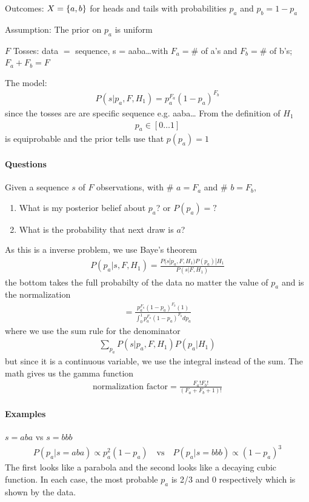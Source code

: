 \documentclass[../main.tex]{subfiles}
\begin{document}
Outcomes: $X = \qt{a, b}$ for heads and tails with probabilities $p_a$ and $p_b = 1 - p_a$

Assumption: The prior on $p_a$ is uniform

$F$ Tosses: data $=$ sequence, s = aaba\dots with $F_a = \#$ of a's and $F_b = \#$ of b's; 
$F_a + F_b = F$

The model:
\begin{align*}
    P(s| p_a, F, H_1) = p_a^{F_a} (1-p_a)^{F_b}
\end{align*}
since the tosses are are specific sequence e.g. {aaba\dots} From the definition of $H_1$
\begin{align*}
    p_a \in [0\dots 1]
\end{align*}
is equiprobable and the prior tells use that $p(p_a) = 1$

\paragraph{Questions} Given a sequence $s$ of $F$ observations, with \# $a= F_a$ and \# $b = F_b$,
\begin{enumerate}
    \item What is my posterior belief about $p_a$? or $P(p_a)= ?$
    \item What is the probability that next draw is $a$?
\end{enumerate}
As this is a inverse problem, we use Baye's theorem
\begin{align*}
    P(p_a|s, F, H_1) = \frac{P(s|p_a, F, H_1) P(p_a)| H_1}{P(s | F, H_1)}
\end{align*}
the bottom takes the full probabilty of the data no matter the value of $p_a$ and is the normalization
\begin{align*}
    = \frac{p_a^{F_a} (1-p_a)^{F_b}(1)}{\int_0^1 p_a^{F_a} (1-p_a)^{F_b} dp_a}
\end{align*}
where we use the sum rule for the denominator
\begin{align*}
    \sum_{p_a} P(s|p_a, F, H_1) P(p_a|H_1)
\end{align*}
but since it is a continuous variable, we use the integral instead of the sum. The math gives us the
gamma function
\begin{align*}
    \textrm{normalization factor} = \frac{F_a! F_b!}{(F_a + F_b + 1)!}
\end{align*}

\paragraph{Examples} $s = aba$ vs $s = bbb$
\begin{align*}
    P(p_a| s = aba) \propto p_a^2 (1-p_a) \quad \textrm{vs} \quad P(p_a| s = bbb) \propto (1-p_a)^3
\end{align*}
The first looks like a parabola and the second looks like a decaying cubic function. In each case,
the most probable $p_a$ is 2/3 and 0 respectively which is shown by the data.
\end{document}
